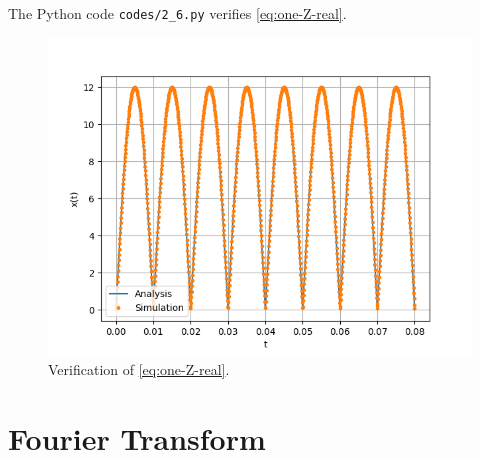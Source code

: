 \documentclass[journal,12pt,twocolumn]{IEEEtran}
\renewcommand\thesection{\arabic{section}}
\begin{document}
\begin{enumerate}[label=\thesection.\arabic*,ref=\thesection.\theenumi]
\solution The Python code \texttt{codes/2\_6.py} verifies \eqref{eq:one-Z-real}.
\begin{figure}[!ht]
    \includegraphics[width=\columnwidth]{figs/2_6.png}
    \caption{Verification of \eqref{eq:one-Z-real}.}
    \label{fig:ver-real}
\end{figure}
\end{enumerate}
\section{Fourier Transform}
\end{document}
